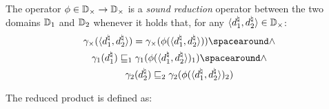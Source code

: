 \begin{definition}
  The operator $\phi\in\mathbb{D}_{\times}\to\mathbb{D}_{\times}$ is a \emph{sound reduction} operator between the two domains $\mathbb{D}_1$ and $\mathbb{D}_2$ whenever it holds that, for any $\langle d^\natural_1, d^\natural_2 \rangle \in \mathbb{D}_{\times}$:
  \begin{gather*}
    \productdomainconcretization(\tuple{\defabstractvalue_1}{\defabstractvalue_2}) = \productdomainconcretization(\productdomainreduce(\tuple{\defabstractvalue_1}{\defabstractvalue_2})) \LanD {} \\
    \abstractdomainconcretization_1(\defabstractvalue_1) \abstractdomainsubseteq_1 \abstractdomainconcretization_1(\productdomainreduce(\tuple{\defabstractvalue_1}{\defabstractvalue_2})_1) \LanD {} \\
    \abstractdomainconcretization_2(\defabstractvalue_2) \abstractdomainsubseteq_2 \abstractdomainconcretization_2(\productdomainreduce(\tuple{\defabstractvalue_1}{\defabstractvalue_2})_2)
  \end{gather*}
\end{definition}

The reduced product is defined as:


